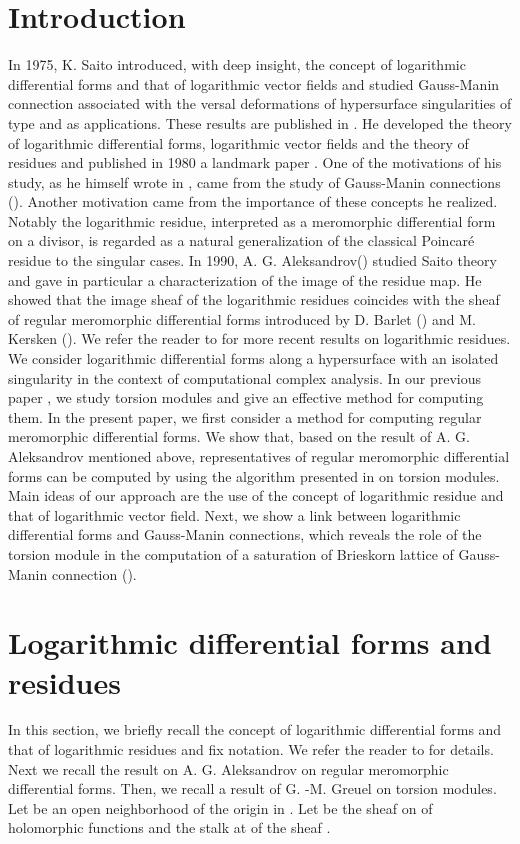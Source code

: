 \documentclass{arxsigma}
\begin{document}
\section{Introduction}
In 1975, K. Saito introduced, with deep insight,
the concept of logarithmic differential forms and that of logarithmic vector fields and studied Gauss-Manin connection associated with the versal deformations of hypersurface singularities of type   and   as applications. These results are published in \cite{S77}. He developed the theory of logarithmic differential forms, logarithmic vector fields and the theory of residues and published in 1980 a landmark paper \cite{S}. One of the motivations of his study, as he himself wrote in \cite{S}, came from the study of Gauss-Manin connections (\cite{B,S73}). Another motivation came from the importance of these concepts he realized.
Notably the logarithmic residue, interpreted as a meromorphic differential form on a divisor, is regarded as a natural generalization of the classical Poincar\'e residue
to the singular cases.
In 1990, A. G. Aleksandrov(\cite{A}) studied Saito theory and gave in particular a characterization of the image of the residue map. He showed
that the image sheaf of the logarithmic residues coincides with the sheaf of regular meromorphic differential forms introduced by D. Barlet (\cite{B}) and M. Kersken (\cite{K83,K84}).
We refer the reader to \cite{AT,Bru,CM1,CM2,GS,P} for more recent results on logarithmic residues.
We consider logarithmic differential forms along a hypersurface with an isolated singularity in the context of computational complex analysis. In our previous paper \cite{TN20}, we study torsion modules and give an effective method for computing them.
In the present paper, we first consider a method for computing regular meromorphic differential forms. We show that, based on the result of A. G. Aleksandrov mentioned above, representatives of regular meromorphic differential forms can be computed by using the algorithm presented in \cite{TN20} on torsion modules. Main ideas of our approach are the use of the concept of logarithmic residue and that of logarithmic vector field. Next, we show a link between logarithmic differential forms and Gauss-Manin connections, which reveals the role of the torsion module in the computation of a saturation of Brieskorn lattice of Gauss-Manin connection (\cite{B,Sch,Schu}).
\section{Logarithmic differential forms and residues}
In this section, we briefly recall the concept of logarithmic differential forms and that of logarithmic residues and fix notation. We refer the reader to
\cite{S} for details. Next we recall the result on A. G. Aleksandrov on regular meromorphic differential forms. Then, we recall a result of
G. -M. Greuel on torsion modules.
Let   be an open neighborhood of the origin   in  .
Let   be the sheaf on   of holomorphic functions and   the stalk at   of the sheaf  .
\end{document}
